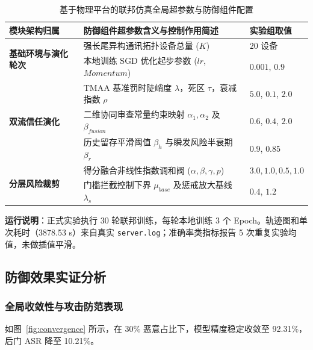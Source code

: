 \documentclass[11pt, a4paper, UTF8, fontset=fandol]{ctexart}
\begin{document}
\begin{table}[htbp]
    \centering
    \caption{基于物理平台的联邦仿真全局超参数与防御组件配置}
    \label{tab:hyperparams}
    \begin{tabular}{p{4cm} p{8.5cm} p{2cm}}
        \toprule
        \textbf{模块架构归属}                        & \textbf{防御组件超参数含义与控制作用简述}                         & \textbf{实验组取值}  \\
        \midrule
        \multirow{2}{*}{\textbf{基础环境与演化轮次}} & 强长尾异构通讯拓扑设备总量 ($K$)                                  & $20$ 设备            \\
                                                     & 本地训练 SGD 优化起步参数 ($lr$, $Momentum$)                      & $0.001$, $0.9$       \\
        \midrule
        \multirow{3}{*}{\textbf{双流信任演化}}       & TMAA 基准罚时陡峭度 $\lambda$，死区 $\tau$，衰减指数 $\rho$       & $5.0$, $0.1$, $2.0$  \\
                                                     & 二维协同审查常量约束映射 $\alpha_1, \alpha_2$ 及 $\beta_{fusion}$ & $0.6$, $0.4$, $2.0$  \\
                                                     & 历史留存平滑阈值 $\beta_h$ 与瞬发风险半衰期 $\beta_r$             & $0.9$, $0.85$        \\
        \midrule
        \multirow{2}{*}{\textbf{分层风险裁剪}}       & 得分融合非线性指数调和阀 ($\alpha, \beta, \gamma, p$)             & $3.0, 1.0, 0.5, 1.0$ \\
                                                     & 门槛拦截控制下界 $\mu_{base}$ 及惩戒放大基线 $\lambda_s$          & $0.4$, $1.2$         \\
        \bottomrule
    \end{tabular}
\end{table}

\textbf{运行说明}：正式实验执行 30 轮联邦训练，每轮本地训练 3 个 Epoch。轨迹图和单次耗时（3878.53 s）来自真实 \texttt{server.log}；准确率类指标报告 5 次重复实验均值，未做插值平滑。

\subsection{防御效果实证分析}

\subsubsection{全局收敛性与攻击防范表现}
如图~\ref{fig:convergence} 所示，在 30\% 恶意占比下，模型精度稳定收敛至 92.31\%，后门 ASR 降至 10.21\%。
\end{document}
